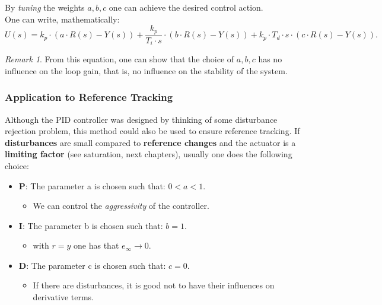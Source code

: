 \documentclass[a4paper,12 pt]{article}
\numberwithin{equation}{section}
\theoremstyle{definition}
\theoremstyle{remark}
\newtheorem*{bmk}{Remark}
\theoremstyle{definition}
\theoremstyle{definition}
\theoremstyle{definition}
\theoremstyle{remark}
\begin{document}
By \textit{tuning} the weights $a,b,c$ one can achieve the desired control action. \\
One can write, mathematically:
\begin{equation}
U(s)=k_p\cdot(a\cdot R(s)-Y(s))+\frac{k_p}{T_i\cdot s}\cdot(b\cdot R(s)-Y(s))+k_p\cdot T_d\cdot s\cdot(c\cdot R(s)-Y(s)).
\end{equation}
\begin{bmk}
From this equation, one can show that the choice of $a,b,c$ has no influence on the loop gain, that is, no influence on the stability of the system.
\end{bmk}
\subsubsection{Application to Reference Tracking}
Although the PID controller was designed by thinking of some disturbance rejection problem, this method could also be used to ensure reference tracking. If \textbf{disturbances} are small compared to \textbf{reference changes} and the actuator is a \textbf{limiting factor} (see saturation, next chapters), usually one does the following choice:
\begin{itemize}
\item \textbf{P}: The parameter a is chosen such that: $0<a<1$.
\begin{itemize}
\item We can control the \textit{aggressivity} of the controller.
\end{itemize}
\item \textbf{I}: The parameter b is chosen such that: $b=1$.
\begin{itemize}
\item  with $r=y$ one has that $e_\infty \rightarrow 0$.
\end{itemize}
\item \textbf{D}: The parameter c is chosen such that: $c=0$.
\begin{itemize}
\item If there are disturbances, it is good not to have their influences on derivative terms.
\end{itemize}
\end{itemize}
\newpage
\end{document}
